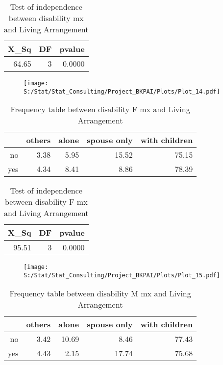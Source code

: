 \documentclass[11pt]{article}
\begin{document}
\begin{table}[H]
\centering
\begin{tabular}{rrr}
  \hline
X\_Sq & DF & pvalue \\ 
  \hline
64.65 & 3 & 0.0000 \\ 
   \hline
\end{tabular}
\caption{Test of independence between disability mx and Living Arrangement} 
\end{table}
\begin{center}
\begin{figure}[H]
\texttt{[image: S:/Stat/Stat\_Consulting/Project\_BKPAI/Plots/Plot\_14.pdf]}

\end{figure}
\end{center}
\begin{table}[H]
\centering
\begin{tabular}{rrrrr}
  \hline
 & others & alone & spouse only & with children \\ 
  \hline
no & 3.38 & 5.95 & 15.52 & 75.15 \\ 
  yes & 4.34 & 8.41 & 8.86 & 78.39 \\ 
   \hline
\end{tabular}
\caption{Frequency table between disability F mx and Living Arrangement} 
\end{table}
\begin{table}[H]
\centering
\begin{tabular}{rrr}
  \hline
X\_Sq & DF & pvalue \\ 
  \hline
95.51 & 3 & 0.0000 \\ 
   \hline
\end{tabular}
\caption{Test of independence between disability F mx and Living Arrangement} 
\end{table}
\begin{center}
\begin{figure}[H]
\texttt{[image: S:/Stat/Stat\_Consulting/Project\_BKPAI/Plots/Plot\_15.pdf]}

\end{figure}
\end{center}
\begin{table}[H]
\centering
\begin{tabular}{rrrrr}
  \hline
 & others & alone & spouse only & with children \\ 
  \hline
no & 3.42 & 10.69 & 8.46 & 77.43 \\ 
  yes & 4.43 & 2.15 & 17.74 & 75.68 \\ 
   \hline
\end{tabular}
\caption{Frequency table between disability M mx and Living Arrangement} 
\end{table}
\end{document}
